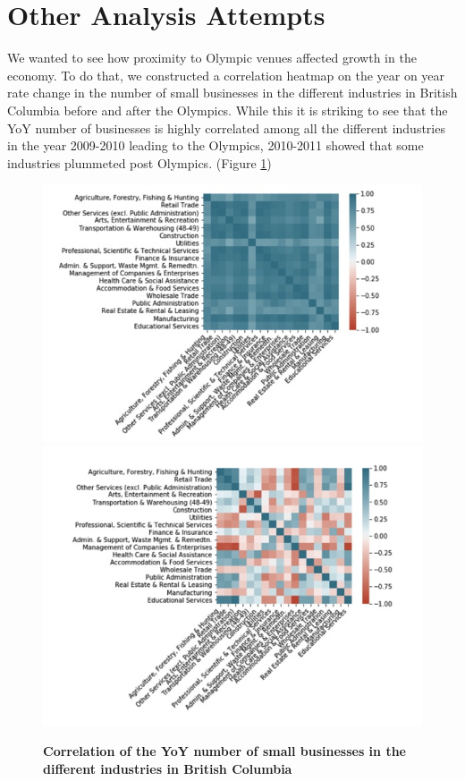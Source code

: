 \documentclass[11pt, twocolumn]{article}
\begin{document}
\appendix                                    
\section{Other Analysis Attempts}

We wanted to see how proximity to Olympic venues affected growth in the economy. To do that, we constructed a correlation heatmap on the year on year rate change in the number of small businesses in the different industries in British Columbia before and after the Olympics. While this it is striking to see that the YoY number of businesses is highly correlated among all the different industries in the year 2009-2010 leading to the Olympics, 2010-2011 showed that some industries plummeted post Olympics. (Figure \ref{fig:Correlation_circle})

\begin{figure}[H]
    \centering
        \includegraphics[scale=0.3]{Correl_2010.jpg}
        \includegraphics[scale=0.3]{Correl_2011.jpg}
    \caption{\textbf{Correlation of the YoY number of small businesses in the different industries in British Columbia}}
    \label{fig:Correlation_circle}
\end{figure}   
\end{document}
